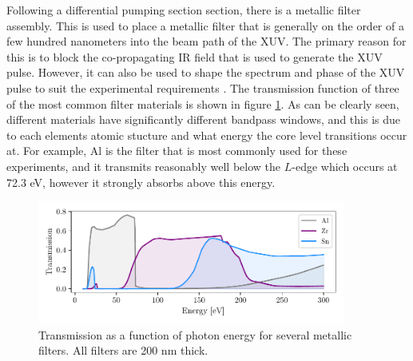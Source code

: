 Following a differential pumping section section, there is a metallic filter assembly.  This is used to place a metallic filter that is generally on the order of a few hundred nanometers into the beam path of the XUV.  The primary reason for this is to block the co-propagating IR field that is used to generate the XUV pulse.  However, it can also be used to shape the spectrum and phase of the XUV pulse to suit the experimental requirements \cite{chiniGenerationCharacterizationApplications2014}.  The transmission function of three of the most common filter materials is shown in figure \ref{fig:filters}.  As can be clearly seen, different materials have significantly different bandpass windows, and this is due to each elements atomic stucture and what energy the core level transitions occur at.  For example, Al is the filter that is most commonly used for these experiments, and it transmits reasonably well below the $L$-edge which occurs at 72.3 eV, however it strongly absorbs above this energy.
\begin{figure}
	\centering
	\includegraphics[width=0.9\textwidth]{figures/Beamline/filters.pdf}
	\caption[Transmission of several metallic filters]{Transmission as a function of photon energy for several metallic filters.  All filters are 200 nm thick.}
	\label{fig:filters}
\end{figure}

